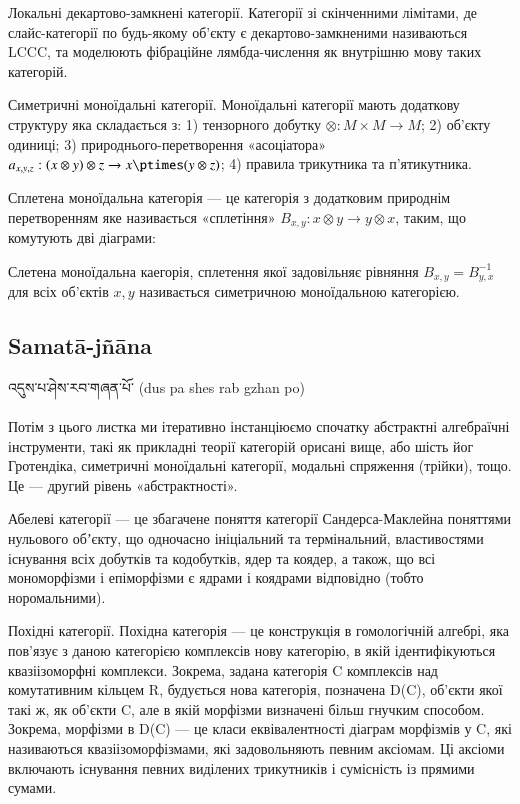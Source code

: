 Локальні декартово-замкнені категорії. Категорії зі скінченними лімітами,
де слайс-категорії по будь-якому об'єкту є декартово-замкненими називаються LCCC,
та моделюють фібраційне лямбда-числення як внутрішню мову таких категорій.

Симетричні моноїдальні категорії. Моноїдальні категорії мають додаткову
структуру яка складається з: 1) тензорного добутку $\otimes: M \times M \rightarrow M$;
2) об'єкту одиниці; 3) природнього-перетворення «асоціатора»
$a_{x,y,z}: (x\otimes y)\otimes z \rightarrow x\ptimes(y \otimes z)$;
4) правила трикутника та п'ятикутника.

Сплетена моноїдальна
категорія --- це категорія з додатковим природнім перетворенням
яке називається «сплетіння» $B_{x,y} : x\otimes y \rightarrow y\otimes x$,
таким, що комутують дві діаграми:

Слетена моноїдальна каегорія, сплетення якої задовільняє
рівняння $B_{x,y} = B^{-1}_{y,x}$ для всіх об'єктів $x,y$ називається
симетричною моноїдальною категорією.

\subsection*{Samatā-jñāna}

\ti འདུས་པ་ཤེས་རབ་གཞན་པོ་ \ua (dus pa shes rab gzhan po)\\
\\
Потім з цього листка ми ітеративно інстанціюємо спочатку абстрактні
алгебраїчні інструменти, такі як прикладні теорії категорій орисані
вище, або шість йог Гротендіка, симетричні моноїдальні категорії,
модальні спряження (трійки), тощо. Це --- другий рівень «абстрактності».

Абелеві категорії --- це збагачене поняття категорії Сандерса-Маклейна
поняттями нульового обʼєкту, що одночасно ініціальний та термінальний,
властивостями існування всіх добутків та кодобутків, ядер та коядер, а
також, що всі мономорфізми і епіморфізми є ядрами і коядрами
відповідно (тобто норомальними).

Похідні категорії. Похідна категорія --- це конструкція в гомологічній
алгебрі, яка пов'язує з даною категорією комплексів нову категорію,
в якій ідентифікуються квазіізоморфні комплекси. Зокрема, задана
категорія C комплексів над комутативним кільцем R, будується нова
категорія, позначена D(C), об'єкти якої такі ж, як об'єкти C, але
в якій морфізми визначені більш гнучким способом. Зокрема, морфізми
в D(C) --- це класи еквівалентності діаграм морфізмів у C, які
називаються квазіізоморфізмами, які задовольняють певним аксіомам.
Ці аксіоми включають існування певних виділених трикутників і
сумісність із прямими сумами.

